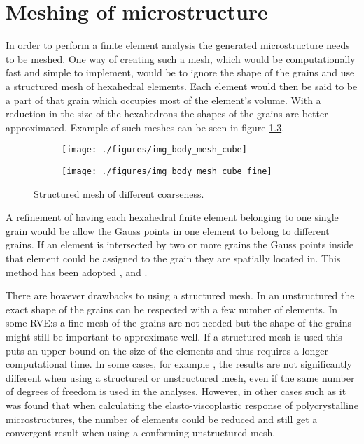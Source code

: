\documentclass[meshing_micro.tex]{subfiles}
\begin{document}
\FloatBarrier

\chapter{Meshing of microstructure}

In order to perform a finite element analysis the generated microstructure needs to be meshed. One way of creating such a mesh, which would be computationally fast and simple to implement, would be to ignore the shape of the grains and use a structured mesh of hexahedral elements. Each element would then be said to be a part of that grain which occupies most of the element's volume. With a reduction in the size of the hexahedrons the shapes of the grains are better approximated. Example of such meshes can be seen in figure \ref{fig:pois_voronoi_mesh_cube}.

\begin{figure}[htpb!]
\centering
\begin{subfigure}[b]{.5\textwidth}
  \centering
  \texttt{[image: ./figures/img\_body\_mesh\_cube]}
  \caption{}
  \label{fig:pois_voronoi_mesh_cube_a}
\end{subfigure}%
\begin{subfigure}[b]{.5\textwidth}
  \centering
  \texttt{[image: ./figures/img\_body\_mesh\_cube\_fine]}
  \caption{}
  \label{fig:pois_voronoi_mesh_cube_b}
\end{subfigure}
\caption{Structured mesh of different coarseness.}
\label{fig:pois_voronoi_mesh_cube}
\end{figure}

A refinement of having each hexahedral finite element belonging to one single grain would be allow the Gauss points in one element to belong to different grains. 
If an element is intersected by two or more grains the Gauss points inside that element could be assigned to the grain they are spatially located in. 
This method has been adopted \cite{Nygards20031049}, \cite{Cailletaud2003351} and \cite{Barbe2001513}. 

There are however drawbacks to using a structured mesh. In an unstructured the exact shape of the grains can be respected with a few number of elements. In some RVE:s a fine mesh of the grains are not needed but the shape of the grains might still be important to approximate well. If a structured mesh is used this puts an upper bound on the size of the elements and thus requires a longer computational time. In some cases, for example \cite{Bohlke201011}, the results are not significantly different when using a structured or unstructured mesh, even if the same number of degrees of freedom is used in the analyses. However, in other cases such as \cite{Li20091163} it was found that when calculating the elasto-viscoplastic response of polycrystalline microstructures, the number of elements could be reduced and still get a convergent result when using a conforming unstructured mesh. 
\end{document}
